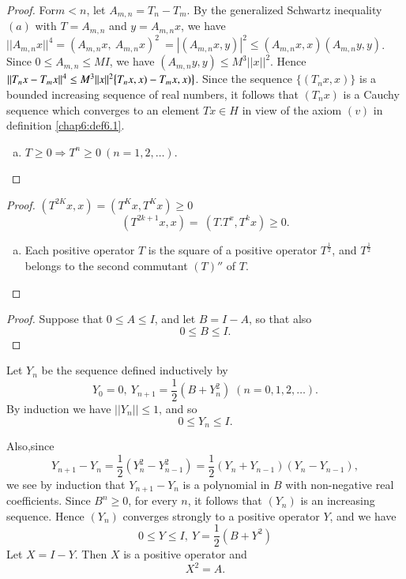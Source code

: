 \begin{proof}
  For\pageoriginale $m < n$, let $A_{m,n} = T_n -T_m$. By the
  generalized Schwartz 
  inequality $(a)$ with $T= A_{m,n}$ and $y= A_{m,n} x$, we have $||
  A_{m,n} x ||^4 =  ( A_{m,n} x, ~ A_{m,n} x)^2 ~ = | (A_{m,n} x,y)
  |^2 \leq (A_{m,n} x,x) (A_{m,n} y,y)$. Since $0 \leq A_{m,n} \leq M
  I$, we have $(A_{m,n} y,y) \leq M^3 || x ||^2$. Hence $|| T_n x -
  T_m x ||^4 \leq M^3 || x ||^2\break \big \{ T_n x,x ) - T_m x,x ) \big
  \}$. Since the sequence $\big \{ (T_n x,x ) \big \}$ is a bounded
  increasing sequence of real numbers, it follows that $(T_n x)$ is a
  Cauchy sequence which converges to an element $Tx \in H$ in view of
  the axiom $(v)$ in definition \ref{chap6:def6.1}. 
  \begin{enumerate}[(e)]
  \item $T \ge 0 \Rightarrow T^n \ge 0 ~ ( n=1,2,\ldots )$.
  \end{enumerate}
\end{proof}

\begin{proof}
 $(T^{2K} x,x ) = ( T^K x, T^K x ) \ge 0$
 $$
 ( T^{2k+1} x,x )  = ~ ( T. T^x, T^k x ) \ge 0. 
 $$
  \begin{enumerate}[(f)]
\item Each positive operator $T$ is the square of a positive operator
  $T^{\frac{1}{2}}$, and $T^{\frac{1}{2}}$ belongs to the second
  commutant $(T)''$ of $T$. 
  \end{enumerate}
\end{proof}

\begin{proof}
  Suppose that $0 \leq A \leq I$, and let $B = I -A$, so that also 
  $$
  0 \leq B \leq I.
  $$
\end{proof}

Let $Y_n$ be the sequence defined inductively by 
$$
Y_0 = 0, ~ Y_{n+1} = \frac{1}{2} (B + Y_n^2) \; (n = 0,1,2, \ldots ).
$$
By induction we have $|| Y_n || \leq 1$, and so 
$$
0 \leq Y_n \leq I.
$$

Also,\pageoriginale since
$$
Y_{n+1} -Y_n = \frac{1}{2} (Y^2_n - Y^2_{n-1}) = \frac{1}{2} (Y_n +
Y_{n-1}) (Y_n - Y_{n-1}), 
$$
we see by induction that $Y_{n+1} -Y_n$ is a polynomial in $B$ with
non-negative real coefficients. Since $B^n \ge 0$, for every $n$, it
follows that $(Y_n)$ is an increasing sequence. Hence $(Y_n)$
converges strongly to a positive operator $Y$, and we have 
$$
0 \leq Y \leq I,~ Y = \frac{1}{2} (B + Y^2)
$$
Let $X= I- Y$. Then $X$ is a positive operator and 
$$
X^2 = A.
$$

